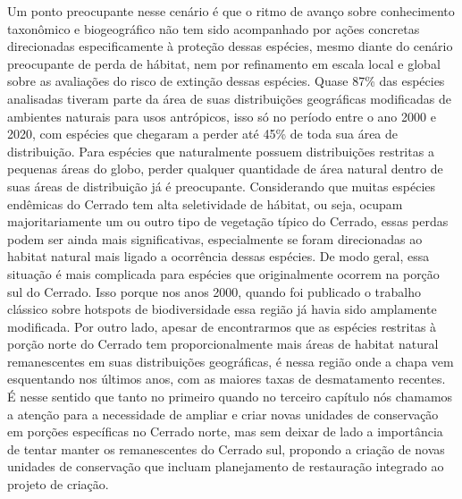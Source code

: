 \documentclass[12pt,openright,oneside,a4paper,english]{abntex2}
\begin{document}
Um ponto preocupante nesse cenário é que o ritmo de avanço sobre conhecimento taxonômico e biogeográfico não tem sido acompanhado por ações concretas direcionadas especificamente à proteção dessas espécies, mesmo diante do cenário preocupante de perda de hábitat, nem por refinamento em escala local e global sobre as avaliações do risco de extinção dessas espécies. Quase 87\% das espécies analisadas tiveram parte da área de suas distribuições geográficas modificadas de ambientes naturais para usos antrópicos, isso só no período entre o ano 2000 e 2020, com espécies que chegaram a perder até 45\% de toda sua área de distribuição. Para espécies que naturalmente possuem distribuições restritas a pequenas áreas do globo, perder qualquer quantidade de área natural dentro de suas áreas de distribuição já é preocupante. Considerando que muitas espécies endêmicas do Cerrado tem alta seletividade de hábitat, ou seja, ocupam majoritariamente um ou outro tipo de vegetação típico do Cerrado, essas perdas podem ser ainda mais significativas, especialmente se foram direcionadas ao habitat natural mais ligado a ocorrência dessas espécies. De modo geral, essa situação é mais complicada para espécies que originalmente ocorrem na porção sul do Cerrado. Isso porque nos anos 2000, quando foi publicado o trabalho clássico sobre hotspots de biodiversidade \citep{Myers2000} essa região já havia sido amplamente modificada. Por outro lado, apesar de encontrarmos que as espécies restritas à porção norte do Cerrado tem proporcionalmente mais áreas de habitat natural remanescentes em suas distribuições geográficas, é nessa região onde a chapa vem esquentando nos últimos anos, com as maiores taxas de desmatamento recentes. É nesse sentido que tanto no primeiro quando no terceiro capítulo nós chamamos a atenção para a necessidade de ampliar e criar novas unidades de conservação em porções específicas no Cerrado norte, mas sem deixar de lado a importância de tentar manter os remanescentes do Cerrado sul, propondo a criação de novas unidades de conservação que incluam planejamento de restauração integrado ao projeto de criação.
\end{document}
